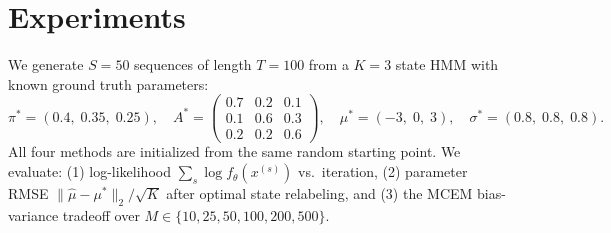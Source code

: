 \documentclass{article}
\newcommand{\E}{\mathbb{E}}
\begin{document}




\pagebreak

\section{Experiments}

We generate $S = 50$ sequences of length $T = 100$ from a $K = 3$ state HMM
with known ground truth parameters:
\begin{equation}
  \pi^* = (0.4,\; 0.35,\; 0.25), \quad
  A^* = \begin{pmatrix} 0.7 & 0.2 & 0.1 \\ 0.1 & 0.6 & 0.3 \\ 0.2 & 0.2 & 0.6 \end{pmatrix}, \quad
  \mu^* = (-3,\; 0,\; 3), \quad
  \sigma^* = (0.8,\; 0.8,\; 0.8).
\end{equation}
All four methods are initialized from the same random starting point.
We evaluate: (1) log-likelihood $\sum_s \log f_\theta(x^{(s)})$ vs.\ iteration,
(2) parameter RMSE $\|\hat\mu - \mu^*\|_2 / \sqrt{K}$ after optimal state
relabeling, and (3) the MCEM bias-variance tradeoff over
$M \in \{10, 25, 50, 100, 200, 500\}$.
\end{document}
